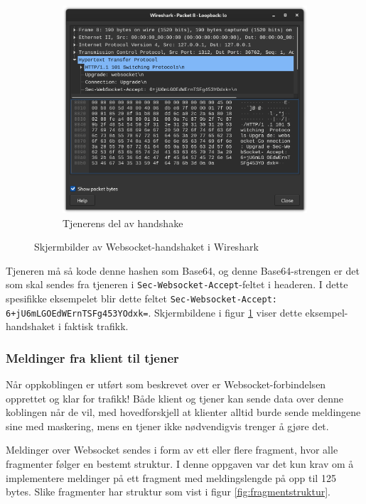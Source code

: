 \documentclass{article}
\newcommand{\code}[1]{\colorbox{light-gray}{\texttt{#1}}}
\begin{document}
\begin{figure}[ht]
\begin{subfigure}{.48\linewidth}
        \includegraphics*[width=\linewidth]{illustrasjoner/WS_handshake_tjener.png}
        \caption{Tjenerens del av handshake}
    \end{subfigure}
    \caption{Skjermbilder av Websocket-handshaket i Wireshark}
    \label{fig:ws_handshake}
\end{figure}

Tjeneren må så kode denne hashen som Base64, og denne Base64-strengen er det som skal sendes fra tjeneren i \code{Sec-Websocket-Accept}-feltet i headeren. I dette spesifikke eksempelet blir dette feltet \code{Sec-Websocket-Accept: 6+jU6mLGOEdWErnTSFg453YOdxk=}. Skjermbildene i figur \ref{fig:ws_handshake} viser dette eksempel-handshaket i faktisk trafikk.

\subsubsection{Meldinger fra klient til tjener}

Når oppkoblingen er utført som beskrevet over er Websocket-forbindelsen opprettet og klar for trafikk! Både klient og tjener kan sende data over denne koblingen når de vil, med hovedforskjell at klienter alltid burde sende meldingene sine med maskering, mens en tjener ikke nødvendigvis trenger å gjøre det.

Meldinger over Websocket sendes i form av ett eller flere fragment, hvor alle fragmenter følger en bestemt struktur. I denne oppgaven var det kun krav om å implementere meldinger på ett fragment med meldingslengde på opp til 125 bytes. Slike fragmenter har struktur som vist i figur \ref{fig:fragmentstruktur}.
\end{document}
